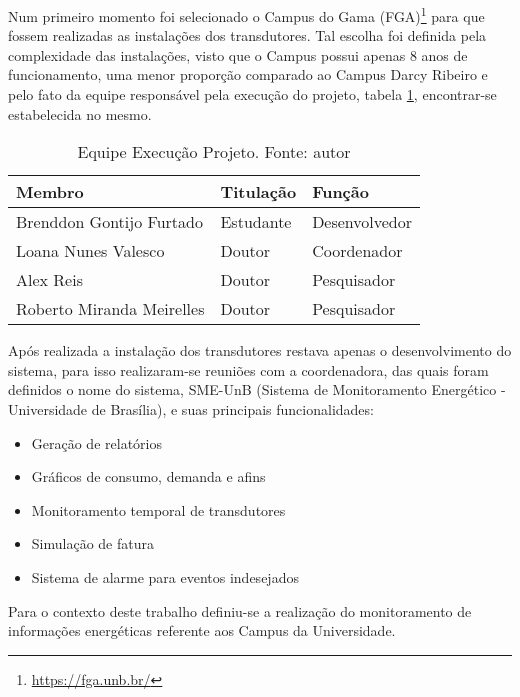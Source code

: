 Num primeiro momento foi selecionado o Campus do Gama (FGA)\footnote{\url{https://fga.unb.br/}} para que
fossem realizadas as instalações dos transdutores. Tal escolha foi definida pela complexidade das instalações, visto que o Campus possui apenas 8 anos de funcionamento, uma menor proporção comparado ao Campus Darcy Ribeiro e pelo fato da equipe responsável pela execução do projeto, tabela \ref{equipe_projeto}, encontrar-se estabelecida no mesmo.

\begin{table}[!htbp]
    \centering
    \caption{Equipe Execução Projeto. Fonte: autor}
    \label{equipe_projeto}
    \begin{tabular}{|p{5cm}|p{2cm}|p{3cm}|}
    \hline
    \textbf{Membro}                                                                    & \textbf{Titulação} & \textbf{Função}        \\\hline
    Brenddon Gontijo Furtado                                                  & Estudante & Desenvolvedor \\\hline
    Loana Nunes Valesco                                                       & Doutor    & Coordenador   \\\hline
    Alex Reis                                                                 & Doutor    & Pesquisador   \\\hline
    Roberto Miranda Meirelles                                                 & Doutor    & Pesquisador   \\\hline
    \end{tabular}
\end{table}

Após realizada a instalação dos transdutores restava apenas o desenvolvimento do sistema, para isso realizaram-se reuniões com a coordenadora, das quais foram definidos o nome do sistema, SME-UnB (Sistema de Monitoramento Energético - Universidade de Brasília), e suas principais funcionalidades:
\begin{itemize}
    \item Geração de relatórios
    \item Gráficos de consumo, demanda e afins
    \item Monitoramento temporal de transdutores
    \item Simulação de fatura
    \item Sistema de alarme para eventos indesejados
\end{itemize}

Para o contexto deste trabalho definiu-se a realização do monitoramento de informações energéticas referente aos Campus da Universidade.

